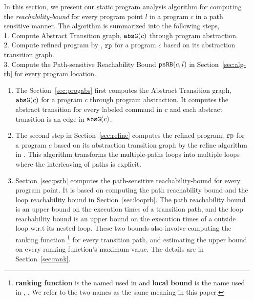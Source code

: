 In this section, we present our static program analysis algorithm for computing 
the \emph{reachability-bound} for every program point $l$ in a program $c$ in a path sensitive manner.
%
The algorithm is summarized into the following steps,
%
\\
    1. Compute Abstract Transition graph, $\mathtt{abs}{\mathtt{G}}(c)$ through program abstraction.
    \\
    2. Compute refined program by \cite{GulwaniJK09}, $\mathtt{rp}$ for a program $c$ based on 
    its abstraction transition graph.
    \\
    3. Compute the Path-sensitive Reachability Bound $\mathtt{psRB}(c, l)$ in Section~\ref{sec:alg-rb} for every
    program location. 
%
\begin{enumerate}
\item  The Section~\ref{sec:progabs} first 
computes the Abstract Transition graph, $\mathtt{abs}{\mathtt{G}}(c)$ for a program $c$ through program abstraction.
It computes the abstract transition 
for every labeled command in $c$ and each abstract transition is an edge in $\mathtt{abs}{\mathtt{G}}(c)$.
\item The second step in Section~\ref{sec:refine}
computes the refined program, $\mathtt{rp}$ for a program $c$ based on 
its abstraction transition graph by the refine algorithm in \cite{GulwaniJK09}.
This algorithm transforms the multiple-paths loops
into multiple loops where
the interleaving of paths is explicit.
\item Section~\ref{sec:psrb} computes the path-sensitive reachability-bound for every program point.
It is based on computing the path reachability bound and the loop reachability bound
in Section~\ref{sec:looprb}.
The path reachability bound is an upper bound on the execution times of a transition path,
and
the loop reachability bound is an upper bound on the execution times of a outside loop 
w.r.t its nested loop. These two bounds also involve computing the ranking function  
\footnote{\textbf{ranking function} is the named used in \cite{SinnZV14}
and \textbf{local bound} is the name used in \cite{ZulegerGSV11}, \cite{sinn2017complexity}.
We refer to the two names as the same meaning in this paper.} 
for every transition path,
and estimating the upper bound on every ranking function's maximum value. The details are in Section~\ref{sec:rank}.
\end{enumerate}
